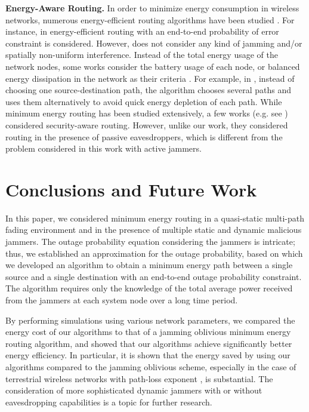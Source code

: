 \documentclass[10pt,journal]{IEEEtran}
\theoremstyle{definition}
\begin{document}
\textbf{Energy-Aware Routing.}
In order to minimize energy consumption in wireless networks, numerous energy-efficient routing  algorithms have been studied \cite{singh1998power,rodoplu1999minimum,chang2000energy,kwon2006energy,dehghan2011minimum,manohar2003power}. {For instance, in \cite{manohar2003power}  energy-efficient routing with an end-to-end probability of error constraint is considered. However, \cite{manohar2003power} does not consider any kind of jamming
and/or spatially non-uniform interference.} Instead of   the total energy usage of the network nodes, some works consider the battery usage of each node, or balanced energy dissipation in the  network as their criteria \cite{shah2002energy,ganesan2001highly,chang2004maximum}. 
For example, in \cite{shah2002energy}, instead of choosing one source-destination path, the algorithm chooses several paths  and uses them alternatively to avoid quick energy depletion of each path.
While minimum energy routing has been studied extensively, a few works (e.g. see \cite{ghaderi2013efficient,ghaderi2014min})  considered security-aware  routing. However, unlike our work, they considered routing in the presence of passive eavesdroppers, which is different from the problem considered in this work with active jammers.


\section{Conclusions and Future Work}\label{sec:conc}

In this paper, we  considered minimum energy routing in a quasi-static multi-path fading environment and in the presence of multiple static and dynamic malicious jammers.  
The outage probability equation considering the jammers is intricate; thus, we established an approximation for the outage probability, based on which 
we developed an algorithm  to obtain a minimum energy path between a single source and a single destination with an end-to-end outage probability constraint. The algorithm requires only  the knowledge of the total average power received from the jammers at each system node over a long time period. 

By performing simulations using various network parameters, we compared the energy cost of  our algorithms to that of
a   jamming oblivious minimum energy routing algorithm, and showed  that our algorithms achieve significantly better energy efficiency.
In particular, it is shown that the energy saved by using our algorithms compared to the jamming oblivious scheme, especially in the case of terrestrial wireless networks with path-loss exponent , is  substantial.
The consideration of more sophisticated dynamic jammers with or without eavesdropping capabilities is a topic for further research.



 


\end{document}
